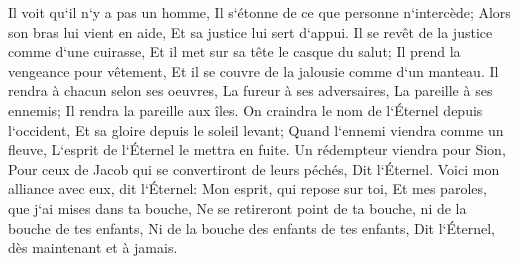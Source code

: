 \verse Il voit qu`il n`y a pas un homme, Il s`étonne de ce que personne n`intercède; Alors son bras lui vient en aide, Et sa justice lui sert d`appui. 
\verse Il se revêt de la justice comme d`une cuirasse, Et il met sur sa tête le casque du salut; Il prend la vengeance pour vêtement, Et il se couvre de la jalousie comme d`un manteau. 
\verse Il rendra à chacun selon ses oeuvres, La fureur à ses adversaires, La pareille à ses ennemis; Il rendra la pareille aux îles. 
\verse On craindra le nom de l`Éternel depuis l`occident, Et sa gloire depuis le soleil levant; Quand l`ennemi viendra comme un fleuve, L`esprit de l`Éternel le mettra en fuite. 
\verse Un rédempteur viendra pour Sion, Pour ceux de Jacob qui se convertiront de leurs péchés, Dit l`Éternel. 
\verse Voici mon alliance avec eux, dit l`Éternel: Mon esprit, qui repose sur toi, Et mes paroles, que j`ai mises dans ta bouche, Ne se retireront point de ta bouche, ni de la bouche de tes enfants, Ni de la bouche des enfants de tes enfants, Dit l`Éternel, dès maintenant et à jamais. 


